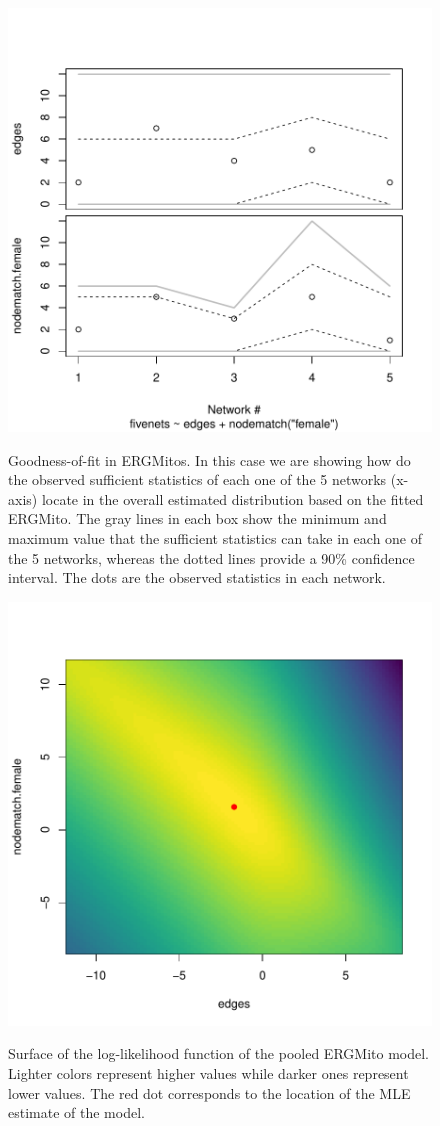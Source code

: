 \documentclass[12pt]{article}
\begin{document}
\begin{figure}[tb]
    \centering
    \caption{Goodness-of-fit in ERGMitos. In this case we are showing how do the observed sufficient statistics of each one of the 5 networks (x-axis) locate in the overall estimated distribution based on the fitted ERGMito. The gray lines in each box show the minimum and maximum value that the sufficient statistics can take in each one of the 5 networks, whereas the dotted lines provide a 90\% confidence interval. The dots are the observed statistics in each network.}
    \includegraphics[width=.7\linewidth]{figures/fivenets_gof.pdf}
    \label{fig:fivenets-gof}
\end{figure}

\begin{figure}[tb]
    \centering
    \caption{Surface of the log-likelihood function of the pooled ERGMito model. Lighter colors represent higher values while darker ones represent lower values. The red dot corresponds to the location of the MLE estimate of the model.}
    \includegraphics[width=.7\linewidth]{figures/fivenets_loglike.pdf}
    \label{fig:fivenets-loglike}
\end{figure}
\end{document}
